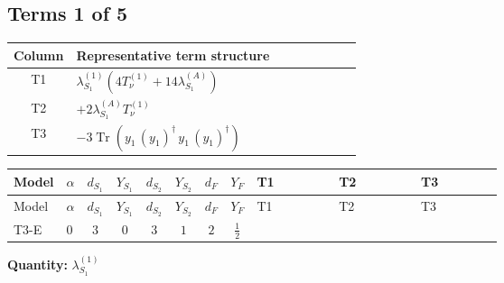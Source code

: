 \documentclass[8pt]{article}
\begin{document}
\begin{landscape}
\subsection*{Terms 1 of 5}
\begin{center}
\begin{tabular}{@{}c >{\raggedright\arraybackslash}p{0.82\linewidth}@{}}
\toprule
Column & Representative term structure \\
\midrule
T1 & \(\displaystyle {\lambda_{S_1}^{(1)}} (4 T_{\nu}^{(1)}+14 {\lambda_{S_1}^{(A)}})\) \\
\midrule
T2 & \(\displaystyle +2 {\lambda_{S_1}^{(A)}} T_{\nu}^{(1)}\) \\
\midrule
T3 & \(\displaystyle -3 \operatorname{Tr}\!\left({y_1}\,\left({y_1}\right)^{\dagger}\,{y_1}\,\left({y_1}\right)^{\dagger}\right)\) \\
\midrule
\bottomrule
\end{tabular}
\end{center}
\smallskip
\tiny
\begin{longtable}{@{}llcccccc >{\raggedright\arraybackslash}p{0.21\linewidth} >{\raggedright\arraybackslash}p{0.21\linewidth} >{\raggedright\arraybackslash}p{0.21\linewidth}@{}}
\toprule
Model & $\alpha$ & $d_{S_1}$ & $Y_{S_1}$ & $d_{S_2}$ & $Y_{S_2}$ & $d_F$ & $Y_F$ & T1 & T2 & T3 \\
\midrule
\endfirsthead
\toprule
Model & $\alpha$ & $d_{S_1}$ & $Y_{S_1}$ & $d_{S_2}$ & $Y_{S_2}$ & $d_F$ & $Y_F$ & T1 & T2 & T3 \\
\midrule
\endhead
T3-E & $0$ & $3$ & $0$ & $3$ & $1$ & $2$ & $\frac{1}{2}$ & \scriptsize\adjustbox{max width=\linewidth}{$\begin{gathered} {\lambda_{S_1}^{(1)}} (4 T_{\nu}^{(1)}+14 {\lambda_{S_1}^{(A)}})\end{gathered}$} & \scriptsize\adjustbox{max width=\linewidth}{$\begin{gathered} +2 {\lambda_{S_1}^{(A)}} T_{\nu}^{(1)}\end{gathered}$} & \scriptsize\adjustbox{max width=\linewidth}{$\begin{gathered} -3 \operatorname{Tr}\!\left({y_1}\,\left({y_1}\right)^{\dagger}\,{y_1}\,\left({y_1}\right)^{\dagger}\right)\end{gathered}$} \\
\midrule
\bottomrule
\end{longtable}
\clearpage
\noindent\textbf{Quantity: }$\lambda_{S_1}^{(1)}$\par\smallskip

\end{landscape}
\end{document}
